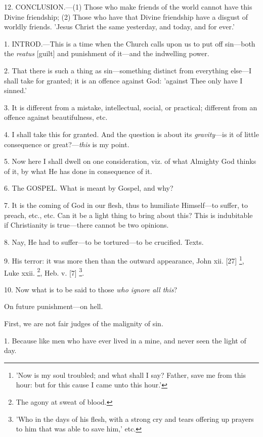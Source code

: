 12. CONCLUSION.—(1)
Those who make friends of the world cannot have this Divine
friendship; (2) Those who have that Divine friendship have a disgust
of worldly friends. 'Jesus Christ the same yesterday, and today, and
for ever.'


1. INTROD.—This
is a time when the Church calls upon us to put off sin—both the \emph{reatus}
[guilt] and punishment of it—and the indwelling power.

2. That there is such a thing as sin—something
distinct from everything else—I shall take for granted; it is an
offence against God: 'against Thee only have I sinned.'

3. It is different from a mistake, intellectual,
social, or practical; different from an offence against
beautifulness, etc.

4. I shall take this for granted. And the
question is about its \emph{gravity}—is it of little consequence or
great?—\emph{this} is my point.

5. Now here I shall dwell on one consideration,
viz. of what Almighty God thinks of it, by what He has done in
consequence of it.

6. The GOSPEL.
What is meant by Gospel, and why?

7. It is the coming of God in our flesh, thus to
humiliate Himself—to suffer, to preach, etc., etc. Can it be a light
thing to bring about this? This is indubitable if Christianity is
true—there cannot be two opinions.

8. Nay, He had to suffer—to be tortured—to be
crucified. Texts.

9. His terror: it was more then than the outward
appearance, John xii. [27] \footnote{'Now is my soul
troubled; and what shall I say? Father, save me from this hour: but
for this cause I came unto this hour.'},
Luke xxii. \footnote{The agony at sweat of
blood.}, Heb. v.
[7] \footnote{'Who in the days of his
flesh, with a strong cry and tears offering up prayers to him that was
able to save him,' etc.}.

10. Now what is to be said to those \emph{who ignore
all this}?


On future punishment—on hell.

First, we are not fair judges of the malignity of
sin.

1. Because like men who have ever lived in a
mine, and never seen the light of day.

